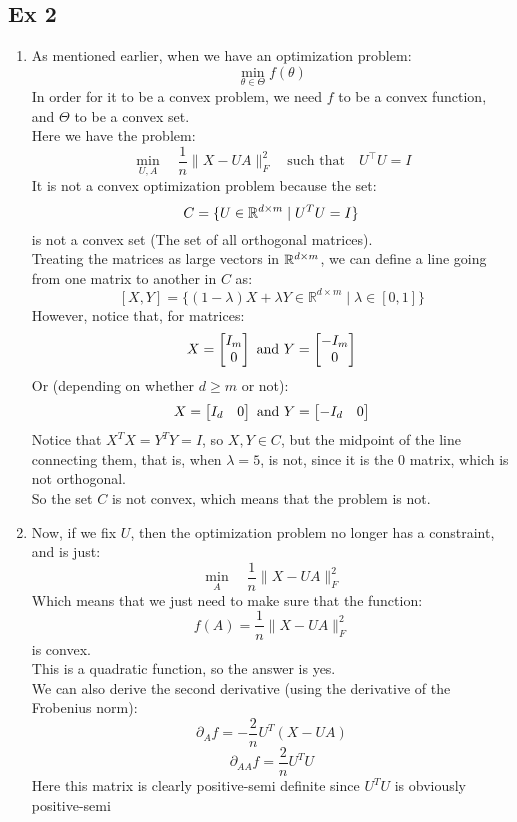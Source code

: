 \documentclass[12pt]{article}
\begin{document}
\subsection*{Ex 2}
\begin{enumerate}[label = \letters]
    \item 
    As mentioned earlier, when we have an optimization
    problem:
    \[ \min_{\theta \in \Theta} f(\theta) \]
    In order for it to be a convex problem,
    we need $f$ to be a convex function,
    and $\Theta$ to be a convex set. \\
    Here we have the problem:
    \[ \min_{U, A} \quad \frac{1}{n} \| X - U A \|_F^2 \quad 
    \text{such that} \quad U^\top U = I \]
    It is not a convex optimization problem because
    the set:
    \[ C = \{U \in \mathbb{R}^{d \times m} \mid U^TU = I\} \]
    is not a convex set (The set of all orthogonal
    matrices). \\
    Treating the matrices as large vectors in 
    $\mathbb{R}^{d \times m}$, we can define a line going 
    from one matrix to another in $C$ as:
    \[ [X, Y] = 
    \{ (1 - \lambda) X + \lambda Y \in 
    \mathbb{R}^{d \times m} \mid \lambda \in [0,1] \} \]
    However, notice that, for matrices:
    \[ X = \begin{bmatrix} I_m \\ 0 \end{bmatrix} \text{ and } Y = \begin{bmatrix} -I_m \\ 0 \end{bmatrix} \]
    Or (depending on whether $d \geq m$ or not):
    \[ X = \begin{bmatrix} I_d & 0 \end{bmatrix} \text{ and } Y = \begin{bmatrix} -I_d & 0 \end{bmatrix} \]
    Notice that $X^TX = Y^TY = I$, so $X, Y \in C$,
    but the midpoint of the line connecting them,
    that is, when $\lambda = 5$,
    is not, since it is the $0$ matrix,
    which is not orthogonal. \\
    So the set $C$ is not convex, which means that
    the problem is not. \\
    \item 
    Now, if we fix $U$, then the optimization
    problem no longer has a constraint, and is just:
    \[ \min_{A} \quad \frac{1}{n} \| X - U A \|_F^2 \]
    Which means that we just need to make
    sure that the function:
    \[ f(A) = \frac{1}{n}\| X - U A \|_F^2 \]
    is convex. \\
    This is a quadratic function, so the answer is yes. \\
    We can also derive the second derivative
    (using the derivative of the Frobenius norm):
    \[ \partial_A f = -\dfrac{2}{n}U^T(X - UA) \]
    \[ \partial_{AA} f = \dfrac{2}{n}U^TU \]
    Here this matrix is clearly positive-semi
    definite since $U^TU$ is obviously positive-semi

\end{enumerate}
\end{document}

